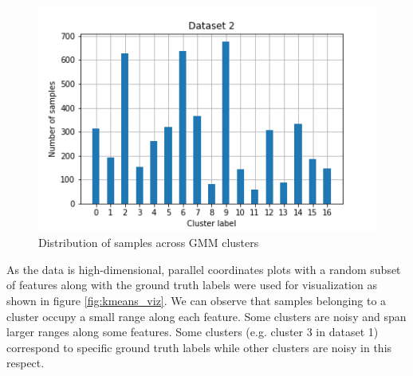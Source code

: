 \documentclass[letterpaper]{article}
\begin{document}
\begin{figure}
\begin{minipage}{.48\textwidth}
			\centering
			\includegraphics[width=.5\linewidth]{../../plots/gmm_hist_2}
			\caption{Distribution of samples across GMM clusters}
			\label{fig:gmm_hist}
		\end{minipage}%
	\end{figure}

	As the data is high-dimensional, parallel coordinates plots with a random subset of features along with the ground truth labels were used for visualization as shown in figure \ref{fig:kmeans_viz}. We can observe that samples belonging to a cluster occupy a small range along each feature. Some clusters are noisy and span larger ranges along some features. Some clusters (e.g. cluster 3 in dataset 1) correspond to specific ground truth labels while other clusters are noisy in this respect.
	
\end{document}
